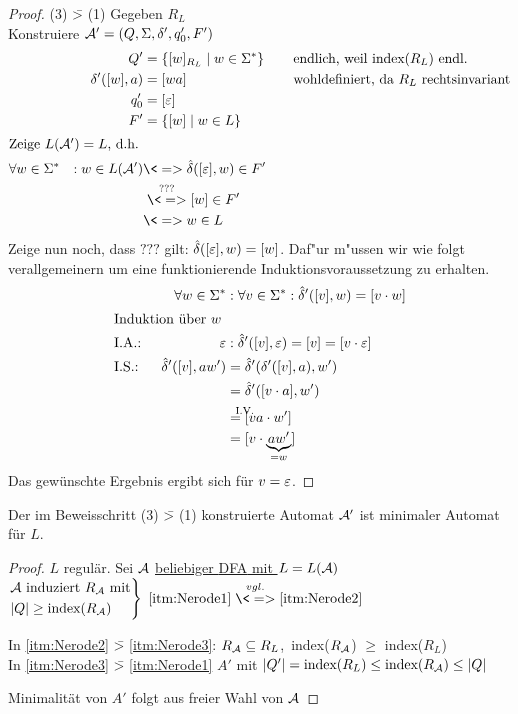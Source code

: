 \begin{proof}
    (3) \=> (1) Gegeben $R_L$\\
		Konstruiere $\mathcal{A}'=(Q,\Sigma,\delta',q_0',F')$
		\begin{alignat*}{3}
			&&Q' &= \{ [w]_{R_L} \mid w\in \Sigma^* \} &\quad& \text{endlich, weil index($R_L$) endl.}\\
			&&\delta'([w],a) &= [wa] && \text{wohldefiniert, da $R_L$ rechtsinvariant}\\
			&&q_0' &= [\Eps]\\
			&&F' &= \{ [w] \mid w\in L \}\\
			\shortintertext{Zeige $L(\A')=L$, d.h. }
			&\forall w\in \Sigma^* &: w\in L(\A') &\<=> \hat\delta([\Eps],w)\in F'\\
			&&&\overset{???}{\<=>} [w]\in F' \\
			&&&\<=> w\in L
		\end{alignat*}
		Zeige nun noch, dass $???$ gilt: $\hat\delta([\varepsilon], w) = [w]$. 
		Daf"ur m"ussen wir wie folgt verallgemeinern um eine funktionierende Induktionsvoraussetzung zu erhalten.
		\begin{alignat*}{3}
			&&\forall w\in\Sigma^* &:
			\forall v\in\Sigma^* : \hat\delta'([v],w) = [v\cdot w]\\
			\shortintertext{Induktion über $w$}
			&\text{I.A.: }& \Eps &: \hat\delta'([v],\Eps) = [v]=[v\cdot\Eps]\\
			&\text{I.S.: }& \hat\delta'([v],aw') &= \hat\delta'(\delta'([v],a),w')\\
			&&&= \hat\delta'([v\cdot a],w')\\
			&&&\overset{\mathrlap{\text{I.V.}}}{=} [va\cdot w']\\
			&&&= [v\cdot \underbrace{aw'}_{=w}]
		\end{alignat*}
		Das gewünschte Ergebnis  ergibt sich für $v=\varepsilon$. \qedhere
\end{proof}
%
\setcounter{Korollar}{4}
\begin{Korollar}
	Der im Beweisschritt (3) \=> (1) konstruierte Automat $\mathcal{A}'$ ist minimaler Automat für $L$.
\end{Korollar}
\begin{proof}
	$L$ regulär. Sei $\mathcal{A}$ \underline{beliebiger \ac{DFA} mit $L=L(\mathcal{A})$}\\
	$\begin{rcases}
	\mathcal{A}\text{ induziert }R_{\mathcal{A}}\text{ mit}\\
	|Q|\geq\text{index}(R_{\mathcal{A}})
	\end{rcases}$ $\ref{itm:Nerode1} \overset{vgl.}{\<=>} \ref{itm:Nerode2}$
	
	In \ref{itm:Nerode2} \=> \ref{itm:Nerode3}: $R_{\mathcal{A}}\subseteq R_L$,\ index($R_{\mathcal{A}}$) $\geq$ index($R_L$)\\
	In \ref{itm:Nerode3} \=> \ref{itm:Nerode1} $A'$ mit $|Q'|=\text{index}(R_L) \leq \text{index}(R_{\mathcal{A}})\leq |Q|$
	
	Minimalität von $A'$ folgt aus freier Wahl von $\mathcal{A}$
\end{proof}

